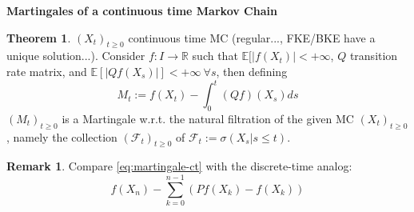 \documentclass[10pt,a4paper]{article}
\theoremstyle{definition}
\newtheorem{teo}{Theorem}[section]
\newtheorem*{rem}{Remark}
\begin{document}
\textbf{Martingales of a continuous time Markov Chain}
\begin{teo}
	$( X_{t})_{t\geq 0}$ continuous time MC (regular..., FKE/BKE have a unique solution...). Consider $f:I\rightarrow \mathbb{R}$ such that $\mathbb{E}[| f( X_{t})| < +\infty $, $Q$ transition rate matrix, and $\mathbb{E}[| Qf( X_{s})| ] < +\infty \ \forall s$, then defining
		\begin{equation}
			M_{t} :=f( X_{t}) -\int _{0}^{t}( Qf)( X_{s}) ds
			\label{eq:martingale-ct}
		\end{equation}
	$( M_{t})_{t\geq 0}$ is a Martingale w.r.t. the natural filtration of the given MC $( X_{t})_{t\geq 0}$, namely the collection $(\mathcal{F}_{t})_{t\geq 0}$ of $\mathcal{F}_{t} :=\sigma ( X_{s} |s\leq t)$.
\end{teo}
\begin{rem}
	Compare \eqref{eq:martingale-ct} with the discrete-time analog:
	\begin{equation*}
		f( X_{n}) -\sum _{k=0}^{n-1}( Pf( X_{k}) -f( X_{k}))
	\end{equation*}
\end{rem}
\end{document}
